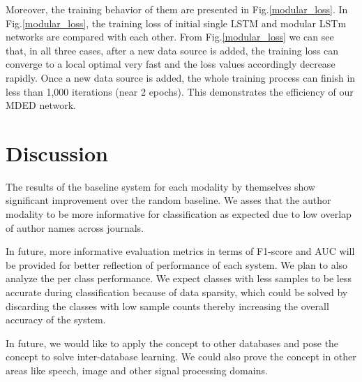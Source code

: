\documentclass[12pt]{article}
\begin{document}
   

Moreover, the training behavior of them are presented in Fig.\ref{modular_loss}. In Fig.\ref{modular_loss}, the  training loss of initial single LSTM and modular LSTm networks are compared with each other. From Fig.\ref{modular_loss} we can see that, in all three cases, after a new data source is added, the training loss can converge to a local optimal very fast and the loss values accordingly decrease rapidly. Once a new data source is added, the whole training process can finish in less than 1,000 iterations (near 2 epochs). This demonstrates the efficiency of our MDED network.
















\section{Discussion}\label{discussion}
The results of the baseline system for each modality by themselves show significant improvement over the random baseline. We asses that the author modality to be more informative for classification as expected due to low overlap of author names across journals.

In future, more informative evaluation metrics in terms of F1-score and AUC will be provided for better reflection of performance of each system. We plan to also analyze the per class performance. We expect classes with less samples to be less accurate during classification because of data sparsity, which could be solved by discarding the classes with low sample counts thereby increasing the overall accuracy of the system. 

In future, we would like to apply the concept to other databases and pose the concept to solve inter-database learning. We could also prove the concept in other areas like speech, image and other signal processing domains.

 

\end{document}
